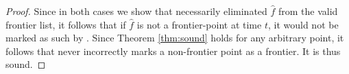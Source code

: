 \begin{proof}
Since in both cases we show that \FFD necessarily eliminated $\hat{f}$ from the
valid frontier list, it follows that if $\hat{f}$ is not a frontier-point at time $t$, it would not
be marked as such by \FFD.
Since Theorem \ref{thm:sound} holds for any arbitrary point, it follows that
\FFD never incorrectly marks a non-frontier point as a frontier. It is thus
sound.
\end{proof}

